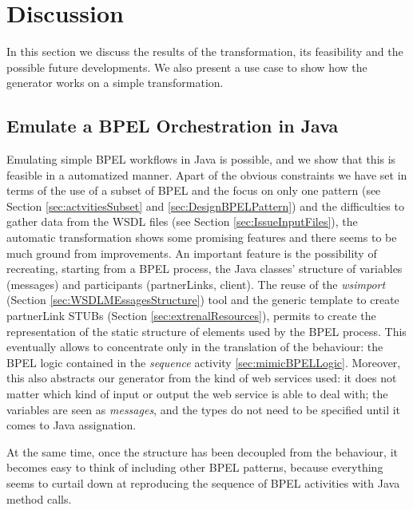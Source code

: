 \section{Discussion}
\label{Discussion}
In this section we discuss the results of the transformation, its feasibility and the possible future developments. We also present a use case to show how the generator works on a simple transformation.
\subsection{Emulate a BPEL Orchestration in Java}
\label{sec:OrchestrEmulation}
Emulating simple BPEL workflows in Java is possible, and we show that this is feasible in a automatized manner. Apart of the obvious constraints we have set in terms of the use of a subset of BPEL and the focus on only one pattern (see Section \ref{sec:actvitiesSubset} and \ref{sec:DesignBPELPattern}) and the difficulties to gather data from the WSDL files (see Section \ref{sec:IssueInputFiles}), the automatic transformation shows some promising features and there seems to be much ground from improvements.
An important feature is the possibility of recreating, starting from a BPEL process, the Java classes' structure of variables (messages) and participants (partnerLinks, client). The reuse of the \textit{wsimport} (Section \ref{sec:WSDLMEssagesStructure}) tool and the generic template to create partnerLink STUBs (Section \ref{sec:extrenalResources}), permits to create the representation of the static structure of elements used by the BPEL process. This eventually allows to concentrate only in the translation of the behaviour: the BPEL logic contained in the \textit{sequence} activity \ref{sec:mimicBPELLogic}. Moreover, this also abstracts our generator from the kind of web services used: it does not matter which kind of input or output the web service is able to deal with; the variables are seen as \textit{messages}, and the types do not need to be specified until it comes to Java assignation.

At the same time, once the structure has been decoupled from the behaviour, it becomes easy to think of including other BPEL patterns, because everything seems to curtail down at reproducing the sequence of BPEL activities with Java method calls. 


